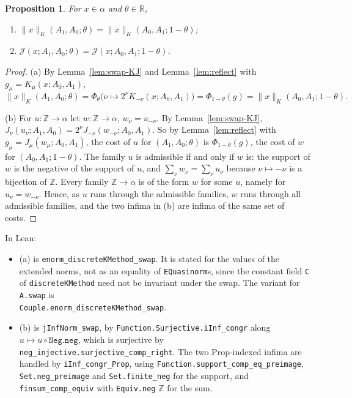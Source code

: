 \documentclass[11pt]{article}
\newtheorem{proposition}[theorem]{Proposition}
\theoremstyle{definition}
\theoremstyle{remark}
\newcommand{\norm}[2]{\lVert #1\rVert_{#2}}
\newcommand{\cJ}{\mathcal J}
\newcommand{\Z}{\mathbb Z}
\begin{document}
\begin{proposition}\label{prop:swap}
  For \(x \in \alpha\) and \(\theta \in \mathbb R\),
  \begin{enumerate}
    \item[(a)] \(\norm{x}{K}(A_1,A_0;\theta) = \norm{x}{K}(A_0,A_1;1-\theta)\);
    \item[(b)] \(\cJ(x;A_1,A_0;\theta) = \cJ(x;A_0,A_1;1-\theta)\).
  \end{enumerate}
\end{proposition}

\begin{proof}
  (a) By Lemma~\ref{lem:swap-KJ} and Lemma~\ref{lem:reflect} with
  \(g_\mu = K_\mu(x;A_0,A_1)\),
  \[
    \norm{x}{K}(A_1,A_0;\theta) = \Phi_\theta\bigl(\nu \mapsto 2^\nu K_{-\nu}(x;A_0,A_1)\bigr)
    = \Phi_{1-\theta}(g) = \norm{x}{K}(A_0,A_1;1-\theta).
  \]

  (b) For \(u \colon \Z \to \alpha\) let \(w \colon \Z \to \alpha\), \(w_\nu = u_{-\nu}\).
  By Lemma~\ref{lem:swap-KJ}, \(J_\nu(u_\nu;A_1,A_0) = 2^\nu J_{-\nu}(w_{-\nu};A_0,A_1)\).
  So by Lemma~\ref{lem:reflect} with \(g_\mu = J_\mu(w_\mu;A_0,A_1)\), the cost of \(u\) for
  \((A_1,A_0;\theta)\) is \(\Phi_{1-\theta}(g)\), the cost of \(w\) for
  \((A_0,A_1;1-\theta)\). The family \(u\) is admissible if and only if \(w\) is: the support
  of \(w\) is the negative of the support of \(u\), and \(\sum_\nu w_\nu = \sum_\nu u_\nu\)
  because \(\nu \mapsto -\nu\) is a bijection of \(\Z\). Every family \(\Z \to \alpha\) is of
  the form \(w\) for some \(u\), namely for \(u_\nu = w_{-\nu}\). Hence, as \(u\) runs through
  the admissible families, \(w\) runs through all admissible families, and the two infima in
  (b) are infima of the same set of costs.
\end{proof}

In Lean:
\begin{itemize}
  \item (a) is \texttt{enorm\_discreteKMethod\_swap}. It is stated for the values of the
    extended norms, not as an equality of \texttt{EQuasinorm}s, since the constant field
    \texttt{C} of \texttt{discreteKMethod} need not be invariant under the swap. The variant
    for \texttt{A.swap} is\\ \texttt{Couple.enorm\_discreteKMethod\_swap}.
  \item (b) is \texttt{jInfNorm\_swap}, by \texttt{Function.Surjective.iInf\_congr} along
    \(u \mapsto u \circ \texttt{Neg.neg}\), which is surjective by
    \texttt{neg\_injective.surjective\_comp\_right}.
    The two Prop-indexed infima are handled by \texttt{iInf\_congr\_Prop}, using
    \texttt{Function.support\_comp\_eq\_preimage}, \texttt{Set.neg\_preimage} and
    \texttt{Set.finite\_neg} for the support, and \texttt{finsum\_comp\_equiv} with
    \texttt{Equiv.neg} \(\Z\) for the sum.
\end{itemize}
\end{document}
